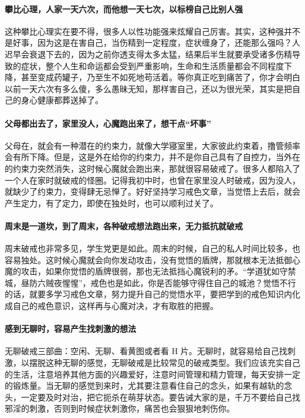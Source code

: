 \paragraph{攀比心理，人家一天六次，而他想一天七次，以标榜自己比别人强}

这种攀比心理实在要不得，很多人以性功能强来炫耀自己厉害。其实，这种强并不是好事，因为这是在害自己，当伤精到一定程度，症状缠身了，还能那么强吗？人迟早会衰退下去的，因为之前你透支得太多太猛，结果后半生就要承受诸多伤精导致的症状，整个人生和命运都会受到严重影响，生命和生活质量都会不同程度下降，甚至变成药罐子，乃至生不如死地苟活着。等你真正吃到痛苦了，你才会明白以前一天六次有多么傻，多么愚昧无知，那样害自己，还以为很光荣，其实是把自己的身心健康都葬送掉了。

\paragraph{父母都出去了，家里没人，心魔跑出来了，想干点“坏事”}

父母在，就会有一种潜在的约束力，就像大学寝室里，大家彼此约束着，撸管频率会有所下降。但是，这是外在给你的约束力，并不是你自己具有了自控力，当外在的约束力突然消失，这时候心魔就会跑出来，那就很容易破戒了。很多人都陷入了一个人在家时就破戒的怪圈。记得我初中时，也曾在家里没人时破戒，因为没人，就缺少了约束力，变得肆无忌惮了。好好坚持学习戒色文章，当觉悟上去后，就会产生定力，有了定力，即使在独处时，也可以顺利过关了。

\paragraph{周末是一道坎，到了周末，各种破戒想法跑出来，无力抵抗就破戒}

周末破戒也非常多见，学生党更是如此。周末的时候，自己的私人时间比较多，也容易独处。这时候心魔就会向你发动攻击，没有觉悟的盾牌，那就根本无法抵御心魔的攻击，如果你觉悟的盾牌很弱，那也无法抵挡心魔锐利的矛。“学道犹如守禁城，昼防六贼夜惺惺”，戒色也是如此，你是否能够守得住自己的城池？觉悟不行的话，就要多学习戒色文章，努力提升自己的觉悟水平，要把学到的戒色知识内化成自己的戒色意识，这样再与心魔对决，才有取胜的把握。

\paragraph{感到无聊时，容易产生找刺激的想法}

无聊破戒三部曲：空闲、无聊、看黄图或者看 H 片。无聊时，就容易给自己找刺激，以摆脱这种无聊的感觉，无聊破戒是比较常见的破戒类型。我们应该充实自己的生活，注意培养其他方面的兴趣爱好，注意时间管理和精力管理，每天安排一定的锻炼量。当无聊的感觉到来时，尤其要注意看住自己的念头，如果有越轨的念头，一定要及时对治，把它扼杀在萌芽状态。要告诫大家的是，千万不要给自己找邪淫的刺激，否则到时候症状刺激你，痛苦也会狠狠地刺伤你。

